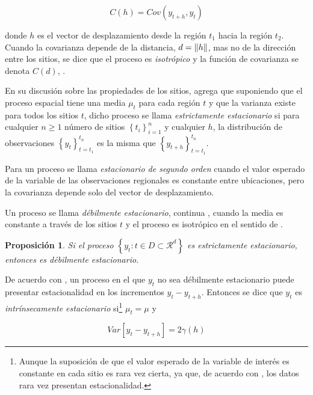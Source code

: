 \documentclass[14pt]{extarticle}
\newtheorem{proposition}[theorem]{Proposición}
\begin{document}
\begin{equation}
	C(h) = Cov(y_{t+h}, y_t)\label{funcion_covarianza}
\end{equation}

\noindent donde $h$ es el vector de desplazamiento desde la región $t_1$ hacia la región $t_2$. Cuando la covarianza depende de la distancia, $d = \norm{h}$, mas no de la dirección entre los sitios, se dice que el proceso es \textit{isotrópico} y la función de covarianza se denota $C(d)$, \cite{Thompson.2012}. 

En su discusión sobre las propiedades de los sitios, \cite{Benedetti.2015} agrega que suponiendo que el proceso espacial tiene una media $\mu_t$ para cada región $t$ y que la varianza existe para todos los sitios $t$, dicho proceso se llama \textit{estrictamente estacionario} si para cualquier $n\geq 1$ número de sitios $\left\lbrace t_i \right\rbrace_{i=1}^n$ y cualquier $h$, la distribución de observaciones $\left\lbrace y_t \right\rbrace_{t=t_1}^{t_n}$ es la misma que $\left\lbrace y_{t + h} \right\rbrace_{t=t_1}^{t_n}$. 

Para \cite{Thompson.2012} un proceso se llama \textit{estacionario de segundo orden} cuando el valor esperado de la variable de las observaciones regionales es constante entre ubicaciones, pero la covarianza depende solo del vector de desplazamiento.

Un proceso se llama \textit{débilmente estacionario}, continua \cite{Benedetti.2015}, cuando la media es constante a través de los sitios $t$ y el proceso es isotrópico en el sentido de \cite{Thompson.2012}. 

\begin{proposition}
	Si el proceso $\left\lbrace y_t : t \in D \subset \mathcal{R}^d \right\rbrace$ es estrictamente estacionario, entonces es débilmente estacionario.
\end{proposition}

De acuerdo con \cite{Benedetti.2015}, un proceso en el que $y_t$ no sea débilmente estacionario puede presentar estacionalidad en los incrementos $y_t - y_{t+h}$. Entonces se dice que $y_t$ es \textit{intrínsecamente estacionario} si\footnote{Aunque la suposición de que el valor esperado de la variable de interés es constante en cada sitio es rara vez cierta, ya que, de acuerdo con \cite{Cressie.1986}, los datos rara vez presentan estacionalidad.} $\mu_t = \mu$ y

\begin{equation}
	Var\left[y_t - y_{t+h}\right] = 2\gamma(h)\label{variograma}
\end{equation}
\end{document}
